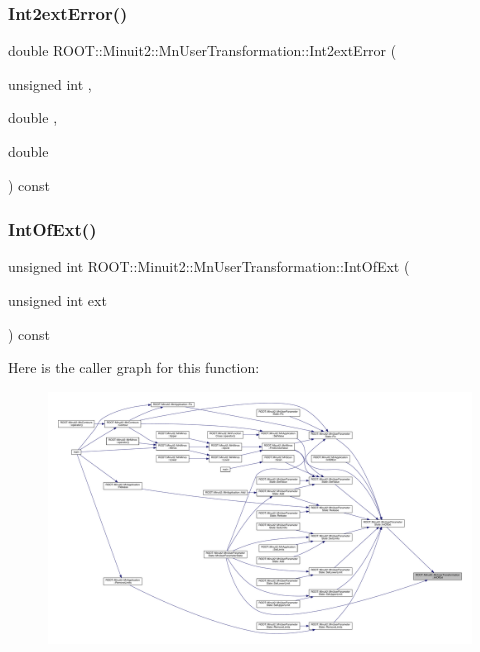 \subsubsection{\texorpdfstring{Int2extError()}{Int2extError()}\hspace{0.1cm}{\footnotesize\ttfamily [2/2]}}
{\footnotesize\ttfamily double R\+O\+O\+T\+::\+Minuit2\+::\+Mn\+User\+Transformation\+::\+Int2ext\+Error (\begin{DoxyParamCaption}\item[{unsigned int}]{,  }\item[{double}]{,  }\item[{double}]{ }\end{DoxyParamCaption}) const}

\mbox{\label{classROOT_1_1Minuit2_1_1MnUserTransformation_a69f58a6d486e2a57789cd8a8445cf23d}} 
\subsubsection{\texorpdfstring{IntOfExt()}{IntOfExt()}\hspace{0.1cm}{\footnotesize\ttfamily [1/2]}}
{\footnotesize\ttfamily unsigned int R\+O\+O\+T\+::\+Minuit2\+::\+Mn\+User\+Transformation\+::\+Int\+Of\+Ext (\begin{DoxyParamCaption}\item[{unsigned int}]{ext }\end{DoxyParamCaption}) const}

Here is the caller graph for this function\+:\nopagebreak
\begin{figure}[H]
\begin{center}
\leavevmode
\includegraphics[width=350pt]{d9/d98/classROOT_1_1Minuit2_1_1MnUserTransformation_a69f58a6d486e2a57789cd8a8445cf23d_icgraph}
\end{center}
\end{figure}
\mbox{\label{classROOT_1_1Minuit2_1_1MnUserTransformation_a69f58a6d486e2a57789cd8a8445cf23d}} 
